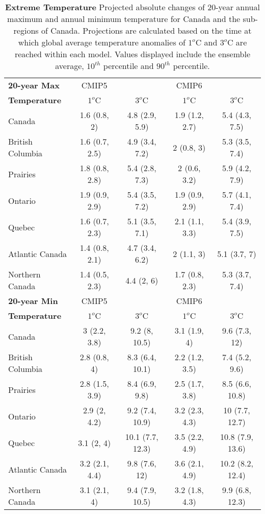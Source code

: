 \documentclass[]{scrartcl}
\begin{document}
\begin{table}[t]
	\caption{\textbf{Extreme Temperature} Projected absolute changes of 20-year annual maximum and annual minimum temperature for Canada and the sub-regions of Canada. Projections are calculated based on the time at which global average temperature anomalies of $1^o$C and $3^o$C are reached within each model. Values displayed include the ensemble average, $10^{th}$ percentile and $90^{th}$ percentile.}\label{table:deg_ext_tas}
	\begin{center}
		\begin{tabularx}{\linewidth}{|L|cc|cc|} 
			\hline
			\textbf{20-year Max} & CMIP5 &  & CMIP6 &   \\
			\textbf{Temperature} & $1^o$C & $3^o$C & $1^o$C & $3^o$C \\
			\hline
			Canada & 1.6 (0.8, 2) & 4.8 (2.9, 5.9) & 1.9 (1.2, 2.7) & 5.4 (4.3, 7.5) \\ 
			British Columbia & 1.6 (0.7, 2.5) & 4.9 (3.4, 7.2) & 2 (0.8, 3) & 5.3 (3.5, 7.4) \\ 
			Prairies & 1.8 (0.8, 2.8) & 5.4 (2.8, 7.3) & 2 (0.6, 3.2) & 5.9 (4.2, 7.9) \\ 
			Ontario & 1.9 (0.9, 2.9) & 5.4 (3.5, 7.2) & 1.9 (0.9, 2.9) & 5.7 (4.1, 7.4) \\ 
			Quebec & 1.6 (0.7, 2.3) & 5.1 (3.5, 7.1) & 2.1 (1.1, 3.3) & 5.4 (3.9, 7.5) \\ 
			Atlantic Canada & 1.4 (0.8, 2.1) & 4.7 (3.4, 6.2) & 2 (1.1, 3) & 5.1 (3.7, 7) \\ 
			Northern Canada & 1.4 (0.5, 2.3) & 4.4 (2, 6) & 1.7 (0.8, 2.3) & 5.3 (3.7, 7.4) \\ 
			\hline
			\textbf{20-year Min} & CMIP5 &  & CMIP6 &   \\
			\textbf{Temperature} & $1^o$C & $3^o$C & $1^o$C & $3^o$C \\	
			\hline
			Canada & 3 (2.2, 3.8) & 9.2 (8, 10.5) & 3.1 (1.9, 4) & 9.6 (7.3, 12) \\ 
			British Columbia & 2.8 (0.8, 4) & 8.3 (6.4, 10.1) & 2.2 (1.2, 3.5) & 7.4 (5.2, 9.6) \\ 
			Prairies & 2.8 (1.5, 3.9) & 8.4 (6.9, 9.8) & 2.5 (1.7, 3.8) & 8.5 (6.6, 10.8) \\ 
			Ontario & 2.9 (2, 4.2) & 9.2 (7.4, 10.9) & 3.2 (2.3, 4.3) & 10 (7.7, 12.7) \\ 
			Quebec & 3.1 (2, 4) & 10.1 (7.7, 12.3) & 3.5 (2.2, 4.9) & 10.8 (7.9, 13.6) \\ 
			Atlantic Canada & 3.2 (2.1, 4.4) & 9.8 (7.6, 12) & 3.6 (2.1, 4.9) & 10.2 (8.2, 12.4) \\ 
			Northern Canada & 3.1 (2.1, 4) & 9.4 (7.9, 10.5) & 3.2 (1.8, 4.3) & 9.9 (6.8, 12.3) \\ 
			\hline	
		\end{tabularx}
	\end{center}
\end{table}
\end{document}
